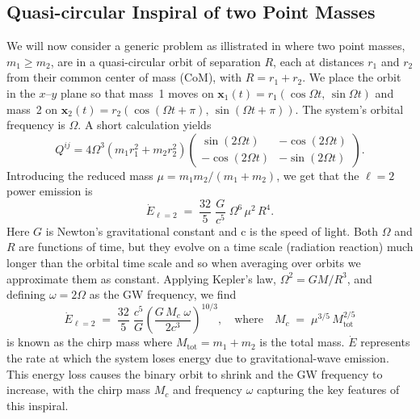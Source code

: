 \documentclass{ucdgradtaughtthesis}
\begin{document}
\subsection{Quasi-circular Inspiral of two Point Masses}
\label{subsec:two_mass_example}
We will now consider a generic problem as illistrated in \cite{intoGRSarp} where two point masses, \(m_1 \ge m_2\), are in a quasi-circular orbit of separation \(R\),
each at distances \(r_1\) and \(r_2\) from their common center of mass (CoM), with
\(R = r_1 + r_2\). We place the orbit in the \(x\)--\(y\) plane so that mass~1 moves on
\(\mathbf{x}_1(t) = r_1(\cos\Omega t,\,\sin\Omega t)\) and mass~2 on
\(\mathbf{x}_2(t) = r_2(\cos(\Omega t+\pi),\,\sin(\Omega t+\pi))\). The system’s orbital
frequency is \(\Omega\). A short calculation yields
%
\begin{equation}
    Q^{ij} = 4 \Omega^3 \left(m_1 r_1^2 + m_2 r_2^2\right)
    \begin{pmatrix}
    \sin(2\Omega t) & -\cos(2\Omega t) \\
    -\cos(2\Omega t) & -\sin(2\Omega t)
    \end{pmatrix}.
\end{equation}
%
%
Introducing the reduced mass \(\mu = m_1 m_2/(m_1 + m_2)\), we get that the \(\ell=2\) power emission is
%
\begin{equation}\label{eq:E_dot_2}
\dot{E}_{\ell=2}
\;=\;
\frac{32}{5}\;\frac{G}{c^5}\;\Omega^6\,\mu^2\,R^4.
\end{equation}
Here \(G\) is Newton's gravitational constant and c is the speed of light. Both \(\Omega\) and \(R\) are functions of time, but they evolve on a time scale (radiation reaction) much longer than the orbital time
scale and so when averaging over orbits we approximate them as constant. Applying Kepler’s law, \(\Omega^2 = GM/R^3\), and defining
\(\omega = 2\Omega\) as the GW frequency, we find
%
%
\begin{equation}
\dot{E}_{\ell=2}
\;=\;
\frac{32}{5}\;\frac{c^5}{G}
\left(\frac{G\, M_c \;\omega}{2c^3}\right)^{10/3},
\quad
\text{where}
\quad
M_c \;=\;\mu^{3/5}\,M_{\text{tot}}^{2/5}
\label{eq:Energy}
\end{equation}
%
is known as the chirp mass where $M_{\text{tot}} = m_1+m_2$ is the total mass.
%
%
$ \dot{E} $ represents the rate at which the system loses energy due to gravitational-wave emission.
This energy loss causes the binary orbit to shrink and the GW frequency to increase, 
with the chirp mass \(M_c\) and frequency \(\omega\) capturing the key features of this inspiral.
%
\end{document}
